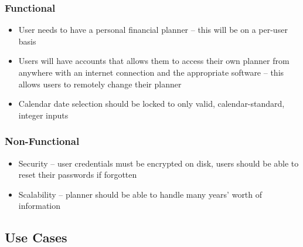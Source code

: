 \documentclass[10pt,conference,onecolumn,compsoc]{IEEEtran}
\begin{document}

\subsubsection{Functional}
\begin{itemize}
\item User needs to have a personal financial planner -- this will be on a per-user basis
\item Users will have accounts that allows them to access their own planner from anywhere with an internet connection and the appropriate software -- this allows users to remotely change their planner
\item Calendar date selection should be locked to only valid, calendar-standard, integer inputs
\end{itemize}


\subsubsection{Non-Functional}
\begin{itemize}
\item Security -- user credentials must be encrypted on disk, users should be able to reset their passwords if forgotten
\item Scalability -- planner should be able to handle many years' worth of information
\end{itemize}


\subsection{Use Cases}

\end{document}
